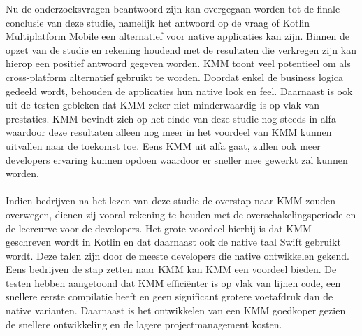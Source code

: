 Nu de onderzoeksvragen beantwoord zijn kan overgegaan worden tot de finale conclusie van deze studie, namelijk het antwoord op de vraag of Kotlin Multiplatform Mobile een alternatief voor native applicaties kan zijn. Binnen de opzet van de studie en rekening houdend met de resultaten die verkregen zijn kan hierop een positief antwoord gegeven worden. KMM toont veel potentieel om als cross-platform alternatief gebruikt te worden. Doordat enkel de business logica gedeeld wordt, behouden de applicaties hun native look en feel. Daarnaast is ook uit de testen gebleken dat KMM zeker niet minderwaardig is op vlak van prestaties. KMM bevindt zich op het einde van deze studie nog steeds in alfa waardoor deze resultaten alleen nog meer in het voordeel van KMM kunnen uitvallen naar de toekomst toe. Eens KMM uit alfa gaat, zullen ook meer developers ervaring kunnen opdoen waardoor er sneller mee gewerkt zal kunnen worden.
\\ \\
Indien bedrijven na het lezen van deze studie de overstap naar KMM zouden overwegen, dienen zij vooral rekening te houden met de overschakelingsperiode en de leercurve voor de developers. Het grote voordeel hierbij is dat KMM geschreven wordt in Kotlin en dat daarnaast ook de native taal Swift gebruikt wordt. Deze talen zijn door de meeste developers die native ontwikkelen gekend. Eens bedrijven de stap zetten naar KMM kan KMM een voordeel bieden. De testen hebben aangetoond dat KMM efficiënter is op vlak van lijnen code, een snellere eerste compilatie heeft en geen significant grotere voetafdruk dan de native varianten. Daarnaast is het ontwikkelen van een KMM goedkoper gezien de snellere ontwikkeling en de lagere projectmanagement kosten.


    

